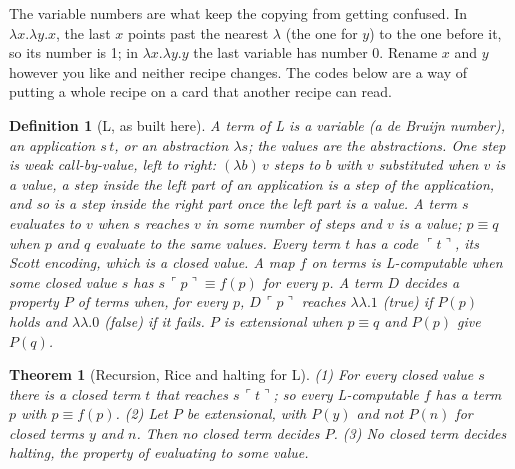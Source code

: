 \documentclass[11pt,twoside]{article}
\theoremstyle{thielethm}
\newtheorem{theorem}{Theorem}[section]
\theoremstyle{thieledef}
\newtheorem{definition}{Definition}[section]
\theoremstyle{thieledef}
\theoremstyle{thieledef}
\theoremstyle{thielethm}
\theoremstyle{thieleobs}
\theoremstyle{thielethm}
\begin{document}
The variable numbers are what keep the copying from getting confused. In $\lambda x.\lambda y.x$,
the last $x$ points past the nearest $\lambda$ (the one for $y$) to the one before it, so its number
is 1; in $\lambda x.\lambda y.y$ the last variable has number 0. Rename $x$
and $y$ however you like and neither recipe changes. The codes below are a way of putting a whole
recipe on a card that another recipe can read.

\begin{definition}[L, as built here]\label{def:u12-L}
A term of L is a variable (a de Bruijn number), an application $s\,t$, or an abstraction
$\lambda s$; the values are the abstractions. One step is weak call-by-value, left to right:
$(\lambda b)\,v$ steps to $b$ with $v$ substituted when $v$ is a value, a step inside the
left part of an application is a step of the application, and so is a step inside the right
part once the left part is a value. A term $s$ \emph{evaluates to} $v$ when $s$ reaches $v$ in
some number of steps and $v$ is a value; $p \equiv q$ when $p$ and $q$ evaluate to the same
values. Every term $t$ has a code $\ulcorner t \urcorner$, its Scott encoding, which is a
closed value. A map $f$ on terms is \emph{L-computable} when some closed value $s$ has
$s\,\ulcorner p \urcorner \equiv f(p)$ for every $p$. A term $D$ \emph{decides} a property $P$ of
terms when, for every $p$, $D\,\ulcorner p \urcorner$ reaches $\lambda\lambda.1$ (true) if
$P(p)$ holds and $\lambda\lambda.0$ (false) if it fails. $P$ is \emph{extensional} when
$p \equiv q$ and $P(p)$ give $P(q)$.
\end{definition}

\begin{theorem}[Recursion, Rice and halting for L]\label{thm:u12-L}
(1) For every closed value $s$ there is a closed term $t$ that reaches
$s\,\ulcorner t \urcorner$; so every L-computable $f$ has a term $p$ with $p \equiv f(p)$.
(2) Let $P$ be extensional, with $P(y)$ and not $P(n)$ for closed terms $y$ and $n$. Then no
closed term decides $P$. (3) No closed term decides halting, the property of evaluating to
some value.
\end{theorem}
\end{document}
